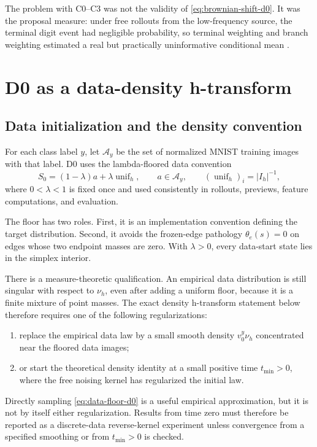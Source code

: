 \documentclass[11pt]{article}
\numberwithin{equation}{section}
\newcommand{\Ih}{I_h}
\newcommand{\unif}{\operatorname{unif}_h}
\newcommand{\1}{\mathbf 1}
\begin{document}
The problem with C0--C3 was not the validity of \eqref{eq:brownian-shift-d0}.  It was the proposal measure: under free rollouts from the low-frequency source, the terminal digit event had negligible probability, so terminal weighting and branch weighting estimated a real but practically uninformative conditional mean \cite[Secs.~4--8]{experiment11-report}.

\section{D0 as a data-density h-transform}

\subsection{Data initialization and the density convention}

For each class label \(y\), let \(\mathcal A_y\) be the set of normalized MNIST training images with that label.  D0 uses the lambda-floored data convention
\begin{equation}\label{eq:data-floor-d0}
  S_0=(1-\lambda)a+\lambda\unif,
  \qquad a\in\mathcal A_y,
  \qquad (\unif)_i=|\Ih|^{-1},
\end{equation}
where \(0<\lambda<1\) is fixed once and used consistently in rollouts, previews, feature computations, and evaluation.

The floor has two roles.  First, it is an implementation convention defining the target distribution.  Second, it avoids the frozen-edge pathology \(\theta_e(s)=0\) on edges whose two endpoint masses are zero.  With \(\lambda>0\), every data-start state lies in the simplex interior.

There is a measure-theoretic qualification.  An empirical data distribution is still singular with respect to \(\nu_h\), even after adding a uniform floor, because it is a finite mixture of point masses.  The exact density h-transform statement below therefore requires one of the following regularizations:
\begin{enumerate}[label=\textup{(D\arabic*)},leftmargin=2.4em]
  \item replace the empirical data law by a small smooth density \(v_0^y\nu_h\) concentrated near the floored data images;
  \item or start the theoretical density identity at a small positive time \(t_{\min}>0\), where the free noising kernel has regularized the initial law.
\end{enumerate}
Directly sampling \eqref{eq:data-floor-d0} is a useful empirical approximation, but it is not by itself either regularization.  Results from time zero must therefore be reported as a discrete-data reverse-kernel experiment unless convergence from a specified smoothing or from \(t_{\min}>0\) is checked.
\end{document}
